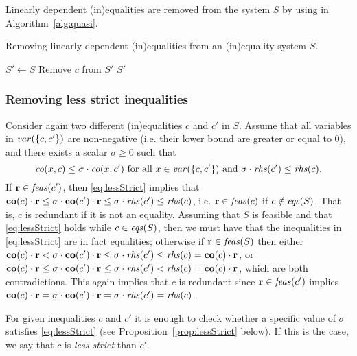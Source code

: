 Linearly dependent (in)equalities are removed from the system $S$ by using  in Algorithm~\ref{alg:quasi}.  
\begin{algorithm}[htbp]\caption{Removing linearly dependent (in)equalities from an (in)equality system $S$.
}\label{alg:quasi}
\begin{algorithmic}[1]
\State $S' \gets S$
\label{line:quasi-for}
		\label{line:quasi-if}
			\State Remove $c$ from $S'$
		\EndIf
	\EndFor
\EndFor
\State \Return $S'$
\EndFunction
\end{algorithmic}
\end{algorithm}
%
\subsubsection{Removing less strict inequalities}\label{para:lessStrict} 
	Consider again two different (in)equalities $c$ and $c'$ in $S$. 
	Assume that all variables in $\mathit{var}(\{c,c'\})$ are non-negative (i.e. their lower bound are greater or equal to $0$), and there exists a scalar $\sigma\geq 0$ such that
\begin{equation}\label{eq:lessStrict}
\mathit{co}(x,c) \leq \sigma\cdot \mathit{co}(x, c') \text{ for all } x\in\mathit{var}(\{c,c'\}) \text{ and } \sigma\cdot \mathit{rhs}(c') \leq \mathit{rhs}(c).
\end{equation}
%
If $\mathbf{r}\in \mathit{feas}(c')$, then \eqref{eq:lessStrict} implies that $\mathbf{co}(c)\cdot\mathbf{r} \leq \sigma\cdot \mathbf{co}(c')\cdot\mathbf{r} \leq \sigma\cdot \mathit{rhs}(c') \leq \mathit{rhs}(c)$, i.e. $\mathbf{r}\in\mathit{feas}(c)$ if $c\notin\mathit{eqs}(S)$. That is, $c$ is redundant if it is not an equality. 
Assuming that $S$ is feasible and that \eqref{eq:lessStrict} holds while $c\in\mathit{eqs}(S)$, then we must have that the inequalities in \eqref{eq:lessStrict} are in fact equalities; otherwise if $\mathbf{r}\in \mathit{feas}(S)$ then either 
$\mathbf{co}(c)\cdot\mathbf{r} < \sigma\cdot \mathbf{co}(c')\cdot\mathbf{r} \leq \sigma\cdot \mathit{rhs}(c') \leq \mathit{rhs}(c) = \mathbf{co}(c)\cdot\mathbf{r}$, or  $\mathbf{co}(c)\cdot\mathbf{r} \leq \sigma\cdot \mathbf{co}(c')\cdot\mathbf{r} \leq \sigma\cdot \mathit{rhs}(c') < \mathit{rhs}(c) = \mathbf{co}(c)\cdot\mathbf{r}$, which are both contradictions. This again implies that $c$ is redundant since $\mathbf{r}\in\mathit{feas}(c')$ implies  $\mathbf{co}(c)\cdot\mathbf{r} = \sigma\cdot \mathbf{co}(c')\cdot\mathbf{r} = \sigma\cdot \mathit{rhs}(c') = \mathit{rhs}(c)$.
	
For given inequalities $c$ and $c'$ it is enough to check whether a specific value of $\sigma$ satisfies \eqref{eq:lessStrict} (see Proposition~\ref{prop:lessStrict} below). If this is the case, we say that $c$ is \emph{less strict} than $c'$.

